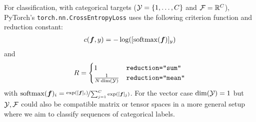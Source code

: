 \begin{example}\label{ex:cross_entropy_loss}
  For classification, with categorical targets (${\mathcal{Y}} = \{1, \dots, C\}$ and ${\mathcal{F}} = {\mathbb{R}}^C$), PyTorch's \texttt{torch.nn.CrossEntropyLoss} uses the following criterion function and reduction constant:
  \begin{align*}
    c({\bm{f}}, y)
    =
    - \log([\mathrm{softmax}({\bm{f}})]_y)
  \end{align*}
  and
  \begin{align*}
    R
    =
    \begin{cases}
      1 & \text{\texttt{reduction="sum"}}
      \\
      \frac{1}{N \dim({\mathcal{Y}})} & \text{\texttt{reduction="mean"}}
    \end{cases}
  \end{align*}
  with $\mathrm{softmax}({\bm{f}})_i = \nicefrac{\exp([{\bm{f}}]_i)}{\sum_{j=1}^C \exp([{\bm{f}}]_{j})}$.
  For the vector case $\dim({\mathcal{Y}}) = 1$ but ${\mathcal{Y}}, {\mathcal{F}}$ could also be compatible matrix or tensor spaces in a more general setup where we aim to classify sequences of categorical labels.
\end{example}
